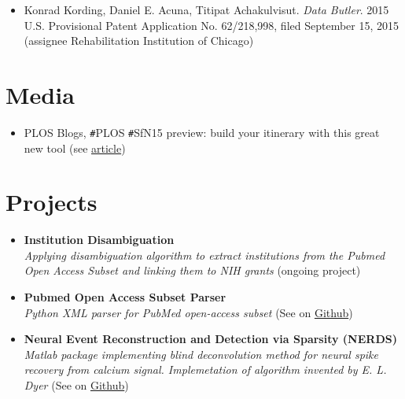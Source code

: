 \documentclass[margin,line]{res}
\begin{document}
\begin{resume}
\begin{itemize}[leftmargin=0cm, label={}]
\item Konrad Kording, Daniel E. Acuna, Titipat Achakulvisut. {\em Data Butler}. 		\hfill 2015\\
U.S. Provisional Patent Application No. 62/218,998, filed September 15, 2015\\
(assignee Rehabilitation Institution of Chicago)

\end{itemize}


\section{\sc Media}

\begin{itemize}[leftmargin=0cm, label={}]

\item PLOS Blogs, \texttt{\#}PLOS \texttt{\#}SfN15 preview: build your itinerary with this great new tool (see \href{http://blogs.plos.org/neuro/2015/10/06/plos-sfn15-preview-build-your-itinerary-with-this-great-new-tool/}{article})

\end{itemize}


\section{\sc Projects}
\begin{itemize}[leftmargin=0cm, label={}]

\item {\bf Institution Disambiguation}\\
{\em Applying disambiguation algorithm to extract institutions from the Pubmed Open Access Subset and linking them to NIH grants} (ongoing project)

\item {\bf Pubmed Open Access Subset Parser}\\
{\em Python XML parser for PubMed open-access subset} (See on \href{https://github.com/titipata/pubmed_parser}{Github})

\item {\bf Neural Event Reconstruction and Detection via Sparsity (NERDS)}\\
{\em Matlab package implementing blind deconvolution method for neural spike recovery from calcium signal. Implemetation of algorithm invented by E. L. Dyer} (See on \href{https://github.com/KordingLab/nerds}{Github})


\end{itemize}
\end{resume}
\end{document}
